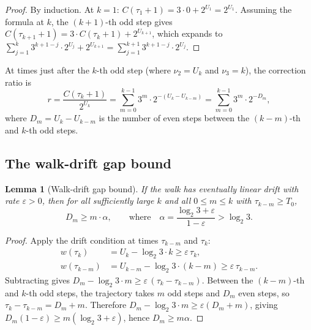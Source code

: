 \documentclass[manuscript]{aomart}
\theoremstyle{plain}
\newtheorem{lemma}[theorem]{Lemma}
\theoremstyle{definition}
\theoremstyle{remark}
\numberwithin{equation}{section}
\begin{document}
\begin{proof}
By induction.  At $k = 1$: $C(\tau_1 + 1) = 3 \cdot 0 + 2^{U_1} =
2^{U_1}$.  Assuming the formula at $k$, the $(k{+}1)$-th odd step
gives $C(\tau_{k+1} + 1) = 3 \cdot C(\tau_k + 1) + 2^{U_{k+1}}$,
which expands to
$\sum_{j=1}^{k} 3^{k+1-j} \cdot 2^{U_j} + 2^{U_{k+1}}
= \sum_{j=1}^{k+1} 3^{k+1-j} \cdot 2^{U_j}$.
\end{proof}

At times just after the $k$-th odd step (where $\nu_2 = U_k$ and
$\nu_3 = k$), the correction ratio is
\begin{equation}\label{eq:r-sum}
  r = \frac{C(\tau_k + 1)}{2^{U_k}}
  = \sum_{m=0}^{k-1} 3^m \cdot 2^{-(U_k - U_{k-m})}
  = \sum_{m=0}^{k-1} 3^m \cdot 2^{-D_m},
\end{equation}
where $D_m = U_k - U_{k-m}$ is the number of even steps between the
$(k{-}m)$-th and $k$-th odd steps.

\subsection{The walk-drift gap bound}

\begin{lemma}[Walk-drift gap bound]\label{lem:D-bound}
If the walk has eventually linear drift with rate $\varepsilon > 0$,
then for all sufficiently large $k$ and all $0 \le m \le k$ with
$\tau_{k-m} \ge T_0$,
\begin{equation}\label{eq:D-bound}
  D_m \ge m \cdot \alpha,
  \qquad\text{where}\quad
  \alpha = \frac{\log_2 3 + \varepsilon}{1 - \varepsilon} > \log_2 3.
\end{equation}
\end{lemma}

\begin{proof}
Apply the drift condition at times $\tau_{k-m}$ and $\tau_k$:
\begin{align*}
  w(\tau_k) &= U_k - \log_2 3 \cdot k \ge \varepsilon\,\tau_k,\\
  w(\tau_{k-m}) &= U_{k-m} - \log_2 3 \cdot (k{-}m) \ge \varepsilon\,\tau_{k-m}.
\end{align*}
Subtracting gives
$D_m - \log_2 3 \cdot m \ge \varepsilon\,(\tau_k - \tau_{k-m})$.
Between the $(k{-}m)$-th and $k$-th odd steps, the trajectory takes
$m$ odd steps and $D_m$ even steps, so
$\tau_k - \tau_{k-m} = D_m + m$.  Therefore
$D_m - \log_2 3 \cdot m \ge \varepsilon(D_m + m)$,
giving $D_m(1-\varepsilon) \ge m(\log_2 3 + \varepsilon)$, hence
$D_m \ge m\alpha$.
\end{proof}
\end{document}
